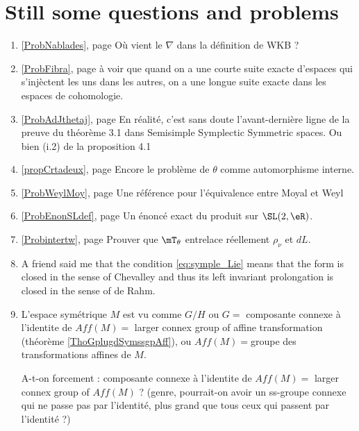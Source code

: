 
\newcommand{\refprob}[1]{\ref{#1}, page \pageref{#1}}

\section{Still some questions and problems}


\begin{enumerate}
\item \refprob{ProbNablades} Où vient le $\nabla$ dans la définition de WKB ?
 \item \refprob{ProbFibra} à voir que quand on a une courte suite exacte d'espaces qui s'injèctent les uns dans les autres, on a une longue suite exacte dans les espaces de cohomologie.
\item  \refprob{ProbAdJthetaj} En réalité, c'est sans doute l'avant-dernière ligne de la preuve du théorème 3.1 dans Semisimple Symplectic Symmetric spaces. Ou bien (i.2) de la proposition 4.1
\item \refprob{propCrtadeux} Encore le problème de $\theta$ comme automorphisme interne.

\item \refprob{ProbWeylMoy} Une référence pour l'équivalence entre Moyal et Weyl
\item \refprob{ProbEnonSLdef} Un énoncé exact du produit sur $\SL(2,\eR)$.
\item \refprob{Probintertw} Prouver que $\mT_{\theta}$ entrelace réellement $\rho_{\nu}$ et $dL$.

    \item
        A friend said me that the condition \eqref{eq:symple_Lie} means that the form is closed in the sense of Chevalley and thus its left invariant prolongation is closed in the sense of de Rahm.
    \item

	L’espace symétrique $M$ est vu comme $G/H$ ou $G =$ composante connexe à l’identite de $Aff(M) =$ larger connex group of affine transformation (théorème \ref{ThoGplugdSymssgpAff}), ou $Aff(M)=$groupe des transformations affines de $M$.

A-t-on forcement : composante connexe à l’identite de $Aff(M)  =$ larger connex group of $Aff(M)$ ?
(genre, pourrait-on avoir un ss-groupe connexe qui ne passe pas par l’identité, plus grand que tous ceux qui passent par l’identité ?) 


\end{enumerate}
